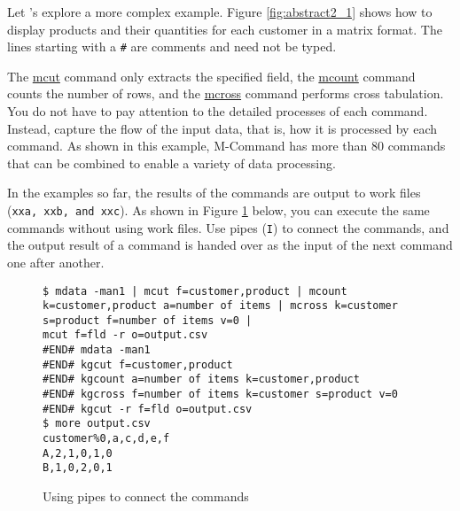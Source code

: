 
Let ’s explore a more complex example. Figure \ref{fig:abstract2_1} shows how to display products and their quantities for each customer in a matrix format. The lines starting with a \verb|#| are comments and need not be typed.

The \hyperref[sect:mcut]{mcut} command only extracts the specified field, the \hyperref[mcount]{mcount} command counts the number of rows, and the \hyperref[mcross]{mcross} command performs cross tabulation. You do not have to pay attention to the detailed processes of each command. Instead, capture the flow of the input data, that is, how it is processed by each command. As shown in this example, M-Command has more than 80 commands that can be combined to enable a variety of data processing.


In the examples so far, the results of the commands are output to work files (\verb|xxa, xxb, and xxc|). As shown in Figure \ref{fig:abstract2-1_1} below, you can execute the same commands without using work files. Use pipes (\verb|I|) to connect the commands, and the output result of a command is handed over as the input of the next command one after another.

%
\begin{figure}[htbp]
\begin{Verbatim}[baselinestretch=0.7,frame=single]
$ mdata -man1 | mcut f=customer,product | mcount k=customer,product a=number of items | mcross k=customer s=product f=number of items v=0 |
mcut f=fld -r o=output.csv
#END# mdata -man1
#END# kgcut f=customer,product
#END# kgcount a=number of items k=customer,product
#END# kgcross f=number of items k=customer s=product v=0
#END# kgcut -r f=fld o=output.csv
$ more output.csv
customer%0,a,c,d,e,f
A,2,1,0,1,0
B,1,0,2,0,1
\end{Verbatim}
\caption{Using pipes to connect the commands\label{fig:abstract2-1_1}}
\end{figure}

%
